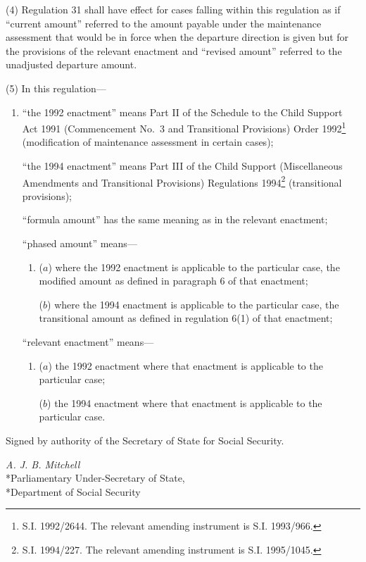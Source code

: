 \documentclass[a4paper]{article}
\begin{document}
(4) Regulation 31 shall have effect for cases falling within this regulation as if “current amount” referred to the amount payable under the maintenance assessment that would be in force when the departure direction is given but for the provisions of the relevant enactment and “revised amount” referred to the unadjusted departure amount.

(5) In this regulation—
\begin{enumerate}\item[]
“the 1992 enactment” means Part II of the Schedule to the Child Support Act 1991 (Commencement No.\ 3 and Transitional Provisions) Order 1992\footnote{\frenchspacing S.I. 1992/2644. The relevant amending instrument is S.I. 1993/966.} (modification of maintenance assessment in certain cases);

“the 1994 enactment” means Part III of the Child Support (Miscellaneous Amendments and Transitional Provisions) Regulations 1994\footnote{\frenchspacing S.I. 1994/227. The relevant amending instrument is S.I. 1995/1045.} (transitional provisions);

“formula amount” has the same meaning as in the relevant enactment;

“phased amount” means—
\begin{enumerate}\item[]
($a$) where the 1992 enactment is applicable to the particular case, the modified amount as defined in paragraph 6 of that enactment;

($b$) where the 1994 enactment is applicable to the particular case, the transitional amount as defined in regulation 6(1) of that enactment;
\end{enumerate}

“relevant enactment” means—
\begin{enumerate}\item[]
($a$) the 1992 enactment where that enactment is applicable to the particular case;

($b$) the 1994 enactment where that enactment is applicable to the particular case.
\end{enumerate}
\end{enumerate}

\bigskip

Signed by authority of the Secretary of State for Social Security.

{\raggedleft
\emph{A. J. B. Mitchell}\\*Parliamentary Under-Secretary of State,\\*Department of Social Security

}
\end{document}
